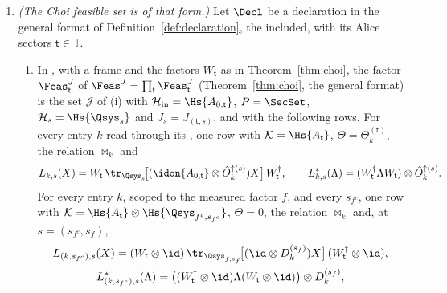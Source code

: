 \begin{lemma}
\begin{enumerate}[label=(\roman*),leftmargin=2.2em]
\begin{equation}
    \langle G,J\rangle\coloneqq\sum_{p\in P}\tr[G_pJ_p]
    \;\ge\;b(G;Y,\Lambda,\lambda)\coloneqq
    d_{\mathrm{in}}\,\lambda+\tr Y
    +\sum_{r\in\mathcal{R}}\sigma_r\tr[\Lambda_r\Theta_r],
  \end{equation}
  so that $b(G;Y,\Lambda,\lambda)\le\inf_{J\in\mathcal{J}}\langle G,J\rangle$.
  No other condition is placed on $Y$, on the $\Lambda_r$ or on $\lambda$:
  $Y$ and the $\Lambda_r$ need not be feasible for any dual program,
  $\lambda$ may be negative, and $Y=0$ with every $\Lambda_r=0$ is admitted.
\item \emph{(The Choi feasible set is of that form.)} Let $\Decl$ be a
  declaration in the general format of Definition~\ref{def:declaration}, the
   included, with its Alice sectors
  $\mathsf t\in\mathbb{T}$.
  \begin{enumerate}[label=(\alph*),leftmargin=2.2em]
  \item In , with a frame and the factors
    $W_{\mathsf t}$ as in Theorem~\ref{thm:choi}, the factor
    $\Feas^{J}_{\mathsf t}$ of $\Feas^{J}=\prod_{\mathsf t}\Feas^{J}_{\mathsf t}$
    (Theorem~\ref{thm:choi}, the general format) is the set $\mathcal{J}$ of
    (i) with $\mathcal{H}_{\mathrm{in}}=\Hs{A_{0,\mathsf t}}$, $P=\SecSet$,
    $\mathcal{H}_s=\Hs{\Qsys_s}$ and $J_s=J_{(\mathsf t,s)}$, and with the
    following rows. For every entry $k$ read through its
    , one row with $\mathcal{K}=\Hs{A_{\mathsf t}}$,
    $\Theta=\Theta^{(\mathsf t)}_k$, the relation $\bowtie_k$ and
    \begin{equation*}
      L_{k,s}(X)=W_{\mathsf t}\,\tr_{\Qsys_s}\!\big[(\idon{A_{0,\mathsf t}}
      \otimes\hat O^{\uparrow(s)}_k)X\big]\,W_{\mathsf t}^{\dagger},
      \qquad
      L^{*}_{k,s}(\Lambda)=(W_{\mathsf t}^{\dagger}\Lambda W_{\mathsf t})
      \otimes\hat O^{\uparrow(s)}_k .
    \end{equation*}
    For every  entry $k$, scoped to the measured factor $f$,
    and every $s_{f^c}$, one row with
    $\mathcal{K}=\Hs{A_{\mathsf t}}\otimes\Hs{\Qsys_{f^c,s_{f^c}}}$,
    $\Theta=0$, the relation $\bowtie_k$ and, at $s=(s_{f^c},s_f)$,
    \begin{gather*}
      L_{(k,s_{f^c}),s}(X)=(W_{\mathsf t}\otimes\id)\,
      \tr_{\Qsys_{f,s_f}}\!\big[(\id\otimes D^{(s_f)}_k)X\big]\,
      (W_{\mathsf t}^{\dagger}\otimes\id),\\
      L^{*}_{(k,s_{f^c}),s}(\Lambda)=\big((W_{\mathsf t}^{\dagger}\otimes\id)
      \Lambda(W_{\mathsf t}\otimes\id)\big)\otimes D^{(s_f)}_k ,

\end{gather*}
\end{enumerate}
\end{enumerate}
\end{lemma}
